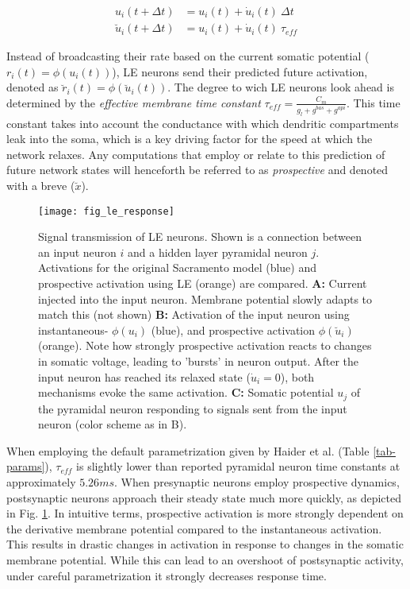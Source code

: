 \begin{align}
  u_i(t+ \Delta t)          & = u_i(t) + \dot{u}_i(t) \ \Delta t \label{eq-r-t-sacramento} \\
  \breve{u}_i(t + \Delta t) & = u_i(t) + \dot{u}_i(t) \ \tau_{eff} \label{eq-r-t-haider}
\end{align}

Instead of broadcasting their rate based on the current somatic potential ($r_i(t) = \phi(u_i(t))$), LE neurons send
their predicted future activation, denoted as $\breve{r}_i(t) = \phi(\breve{u}_i(t))$. The degree to wich LE neurons
look ahead is determined by the \textit{effective membrane time constant} $\tau_{eff} = \frac{C_m}{g_l + g^{bas} +
    g^{api}}$. This time constant takes into account the conductance with which dendritic compartments leak into the soma,
which is a key driving factor for the speed at which the network relaxes. Any computations that employ or relate to this
prediction of future network states will henceforth be referred to as \textit{prospective} and denoted with a breve
($\breve{x}$).


\begin{figure}[h!]
  \centering
  \texttt{[image: fig\_le\_response]}
  \caption[Signal transmission of LE neurons]{Signal transmission of LE neurons. Shown is a connection between an input
    neuron $i$ and a hidden layer pyramidal neuron $j$. Activations for the original Sacramento model (blue) and
    prospective activation using LE (orange) are compared. \textbf{A:} Current injected into the input neuron. Membrane
    potential slowly adapts to match this (not shown) \textbf{B:} Activation of the input neuron using instantaneous-
    $\phi(u_i)$ (blue), and prospective activation $\phi(\breve{u}_i)$ (orange). Note how strongly prospective
    activation reacts to changes in somatic voltage, leading to 'bursts' in neuron output. After the input neuron has
    reached its relaxed state ($\dot{u}_i = 0$), both mechanisms evoke the same activation. \textbf{C:} Somatic
    potential $u_j$ of the pyramidal neuron responding to signals sent from the input neuron (color scheme as in B).}
  \label{fig-comparison-le}
\end{figure}

When employing the default parametrization given by Haider et al. (Table \ref{tab-params}), $\tau_{eff}$ is slightly
lower than reported pyramidal neuron time constants \citep{McCormick1985} at approximately $5.26ms$. When presynaptic
neurons employ prospective dynamics, postsynaptic neurons approach their steady state much more quickly, as depicted in
Fig. \ref{fig-comparison-le}. In intuitive terms, prospective activation is more strongly dependent on the derivative
membrane potential compared to the instantaneous activation. This results in drastic changes in activation in response
to changes in the somatic membrane potential. While this can lead to an overshoot of postsynaptic activity, under
careful parametrization it strongly decreases response time.


